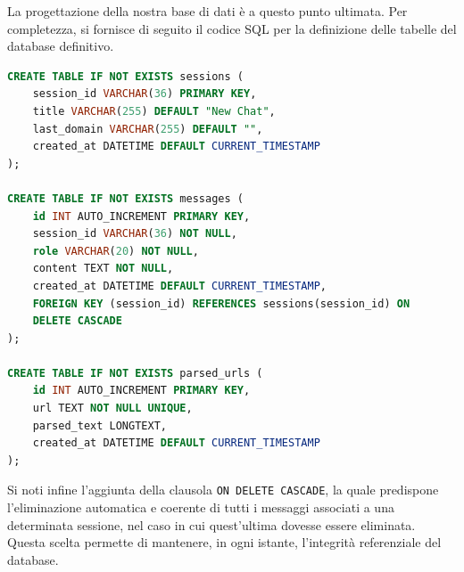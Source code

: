 La progettazione della nostra base di dati è a questo punto ultimata. Per completezza, si fornisce di seguito il codice SQL per la definizione delle tabelle del database definitivo.


\begin{lstlisting}[language=SQL, caption={Codice SQL per la creazione delle tabelle della base di dati.}, label={lst:init_db}]
CREATE TABLE IF NOT EXISTS sessions (
    session_id VARCHAR(36) PRIMARY KEY,
    title VARCHAR(255) DEFAULT "New Chat",
    last_domain VARCHAR(255) DEFAULT "",
    created_at DATETIME DEFAULT CURRENT_TIMESTAMP
);

CREATE TABLE IF NOT EXISTS messages (
    id INT AUTO_INCREMENT PRIMARY KEY,
    session_id VARCHAR(36) NOT NULL,
    role VARCHAR(20) NOT NULL,
    content TEXT NOT NULL,
    created_at DATETIME DEFAULT CURRENT_TIMESTAMP,
    FOREIGN KEY (session_id) REFERENCES sessions(session_id) ON 
    DELETE CASCADE
);

CREATE TABLE IF NOT EXISTS parsed_urls (
    id INT AUTO_INCREMENT PRIMARY KEY,
    url TEXT NOT NULL UNIQUE,
    parsed_text LONGTEXT,
    created_at DATETIME DEFAULT CURRENT_TIMESTAMP
);

\end{lstlisting}

Si noti infine l'aggiunta della clausola \texttt{ON DELETE CASCADE}, la quale predispone l'eliminazione automatica e coerente di tutti i messaggi associati a una determinata sessione, nel caso in cui quest'ultima dovesse essere eliminata. Questa scelta permette di mantenere, in ogni istante, l'integrità referenziale del database.   


